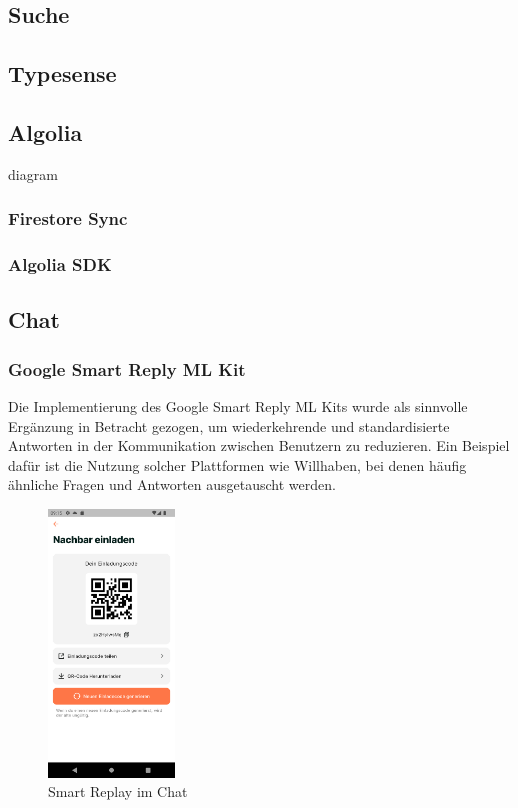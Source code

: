 \subsection{Suche}
\subsection{Typesense}
\subsection{Algolia}
diagram
\subsubsection{Firestore Sync}

\subsubsection{Algolia SDK}


\subsection{Chat}




\subsubsection{Google Smart Reply ML Kit}
Die Implementierung des Google Smart Reply ML Kits wurde als sinnvolle Ergänzung in Betracht gezogen, um wiederkehrende und standardisierte Antworten in der Kommunikation zwischen Benutzern zu reduzieren. Ein Beispiel dafür ist die Nutzung solcher Plattformen wie Willhaben, bei denen häufig ähnliche Fragen und Antworten ausgetauscht werden.

\begin{figure}[H]
  \centering
  \includegraphics[width=0.3\textwidth]{pics/einladecode-page.png}
  \caption{Smart Replay im Chat}
  \label{fig:einladecode}
\end{figure}


